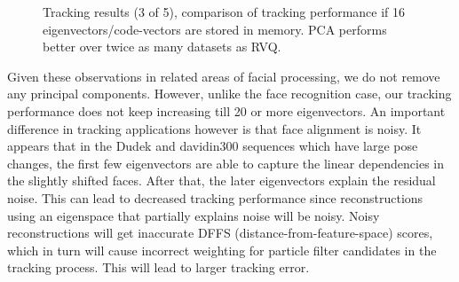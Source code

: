 								\begin{figure}[t]
								\centering
								
								\caption{Tracking results (3 of 5), comparison of tracking performance if 16 eigenvectors/code-vectors are stored in memory.  PCA performs better over twice as many datasets as RVQ.}
								\label{fig:results_final_3_16}
								\end{figure}

Given these observations in related areas of facial processing, we do not remove any principal components.  However, unlike the face recognition case, our tracking performance does not keep increasing till 20 or more eigenvectors.  An important difference in tracking applications however is that face alignment is noisy.  It appears that in the Dudek and davidin300 sequences which have large pose changes, the first few eigenvectors are able to capture the linear dependencies in the slightly shifted faces.  After that, the later eigenvectors explain the residual noise.  This can lead to decreased tracking performance since reconstructions using an eigenspace that partially explains noise will be noisy.  Noisy reconstructions will get inaccurate DFFS (distance-from-feature-space) scores, which in turn will cause incorrect weighting for particle filter candidates in the tracking process.  This will lead to larger tracking error.

